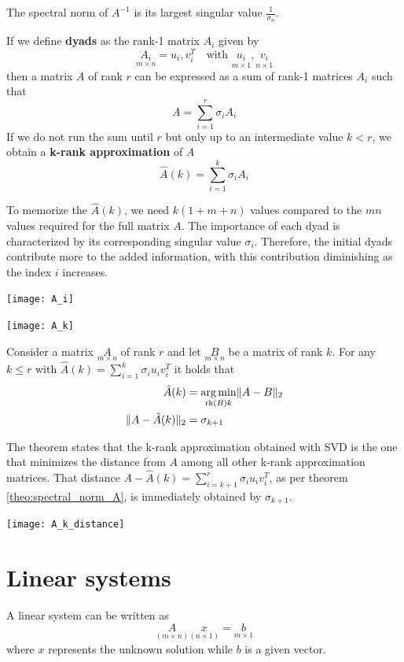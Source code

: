 \documentclass{article}
\begin{document}
\begin{proposition}\label{theo:spectral_norm_inverse_A}
    The spectral norm of $A^{-1}$ is its largest singular value
    $\frac{1}{\sigma_n}$.
\end{proposition}
\begin{definition}
    If we define \textbf{dyads} as the rank-1 matrix $A_i$ given by
    $$\underset{m\times n}{A_i}=u_i,v_i^T\quad
    \text{with }\underset{m\times1}{u_i},\underset{n\times1}{v_i}$$ then a
    matrix $A$ of rank $r$ can be expressed as a sum of rank-1 matrices $A_i$
    such that 
    $$A=\sum_{i=1}^{r}\sigma_iA_i$$
    If we do not run the sum until $r$ but only up to an intermediate value
    $k<r$, we obtain a \textbf{k-rank approximation} of $A$
    $$\hat{A}(k)=\sum_{i=1}^{k}\sigma_iA_i$$
\end{definition}
To memorize the $\hat{A}(k)$, we need $k(1+m+n)$ values compared to the $mn$
values required for the full matrix $A$. The importance of each dyad is
characterized by its corresponding singular value $\sigma_i$. Therefore, the
initial dyads contribute more to the added information, with this contribution
diminishing as the index $i$ increases.
\begin{center}
    \texttt{[image: A\_i]}
\end{center}
\begin{center}
    \texttt{[image: A\_k]}
\end{center}
\begin{theorem}
    Consider a matrix $\underset{m\times n}A$ of rank $r$ and let
    $\underset{m\times n}B$ be a matrix of rank $k$. For any $k\leq r$ with
    $\hat{A}(k)=\sum_{i=1}^{k}\sigma_iu_iv_i^T$ it holds that 
    $$
    \begin{aligned}
        \hat{A}(k)&=\operatorname*{arg\,min}_{\text{rk}(B)k}\lVert A-B\rVert_2\\
        \lVert A-\hat{A}(k)\rVert_2&=\sigma_{k+1}
    \end{aligned}
    $$
\end{theorem}
The theorem states that the k-rank approximation obtained with SVD is the one
that minimizes the distance from $A$ among all other k-rank approximation
matrices. That distance $A-\hat{A}(k)=\sum_{i=k+1}^{r}\sigma_iu_iv_i^T$, as
per theorem \ref{theo:spectral_norm_A}, is immediately obtained by
$\sigma_{k+1}$.
\begin{center}
    \texttt{[image: A\_k\_distance]} 
\end{center}
\cleardoublepage
\section{Linear systems}
A linear system can be written as 
$$\underset{(m\times n)}A\underset{(n\times1)}x=\underset{m\times1}b$$
where $x$ represents the unknown solution while $b$ is a given vector.
\end{document}
